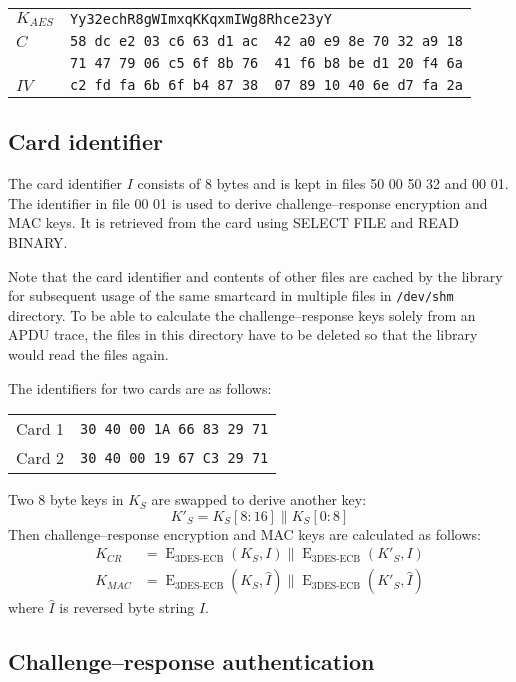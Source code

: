\documentclass[a4paper]{article}
\newcommand{\conc}{\mathbin{\|}}
\DeclareMathOperator{\E}{E}
\begin{document}
\begin{tabular}{ l l }
	$K_{AES}$ & \texttt{Yy32echR8gWImxqKKqxmIWg8Rhce23yY} \\
	$C$ & \texttt{58 dc e2 03 c6 63 d1 ac~~42 a0 e9 8e 70 32 a9 18} \\
	& \texttt{71 47 79 06 c5 6f 8b 76~~41 f6 b8 be d1 20 f4 6a} \\
	$IV$ & \texttt{c2 fd fa 6b 6f b4 87 38~~07 89 10 40 6e d7 fa 2a} \\
\end{tabular}


\subsection{Card identifier}

The card identifier $I$ consists of 8 bytes and is kept in files 50 00 50 32 and 00 01. The identifier in file 00 01 is used to derive challenge--response encryption and MAC keys. It is retrieved from the card using SELECT FILE and READ BINARY.

Note that the card identifier and contents of other files are cached by the library for subsequent usage of the same smartcard in multiple files in \texttt{/dev/shm} directory. To be able to calculate the challenge--response keys solely from an APDU trace, the files in this directory have to be deleted so that the library would read the files again.

The identifiers for two cards are as follows:

\begin{tabular}{ l l }
Card 1 & \texttt{30 40 00 1A 66 83 29 71} \\
Card 2 & \texttt{30 40 00 19 67 C3 29 71} \\
\end{tabular}

Two 8 byte keys in $K_S$ are swapped to derive another key:
\[
K'_S=K_S[8:16]\conc K_S[0:8]
\]
Then challenge--response encryption and MAC keys are calculated as follows:
\begin{align*}
K_{CR} &= \E_\textrm{3DES-ECB}(K_S, I)\conc\E_\textrm{3DES-ECB}(K'_S, I) \\
K_{MAC} &= \E_\textrm{3DES-ECB}(K_S, \hat{I})\conc\E_\textrm{3DES-ECB}(K'_S, \hat{I})
\end{align*}
where $\hat{I}$ is reversed byte string $I$.


\subsection{Challenge--response authentication} \label{sec:chresp}
\end{document}
